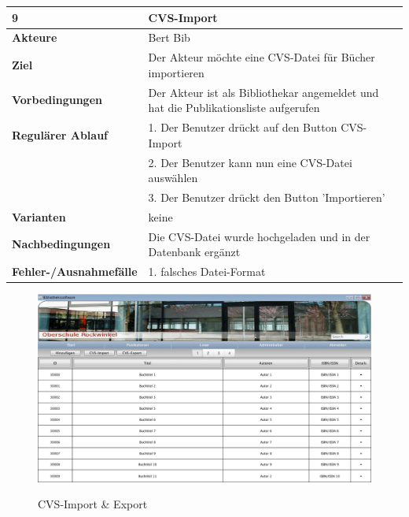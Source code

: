 \documentclass[fontsize=12pt,paper=a4,twoside]{scrartcl}
\begin{document}
\begin{table}[htbp]
\label{9}
\begin{tabular}{|l|p{10cm}|}
\hline 
\textbf{9} & \textbf{CVS-Import} \\ \hline
\textbf{Akteure} & Bert Bib\\ \hline
\textbf{Ziel} & Der Akteur möchte eine CVS-Datei für Bücher importieren \\ \hline
\textbf{Vorbedingungen} & Der Akteur ist als Bibliothekar angemeldet und hat die Publikationsliste 
aufgerufen \\ \hline
\textbf{Regulärer Ablauf} & 
1. Der Benutzer drückt auf den Button CVS-Import \\
&2. Der Benutzer kann nun eine CVS-Datei auswählen\\
&3. Der Benutzer drückt den Button 'Importieren'\\
\hline
\textbf{Varianten} & 
keine \\ \hline
\textbf{Nachbedingungen} & Die CVS-Datei wurde hochgeladen und in der Datenbank ergänzt\\\hline
\textbf{Fehler-/Ausnahmefälle} & 1. falsches Datei-Format\\
\hline
\end{tabular}
\end{table}

\newpage
\begin{figure}[htbp]
\caption{CVS-Import \& Export}
\includegraphics[width=1\textwidth]{ScreensWebsite/PublikationslisteLoggedInBibliothekar.png}
\label{CVS-Import \& Export}
\end{figure}
\end{document}

